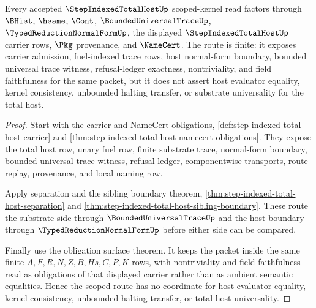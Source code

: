 \begin{theorem}
\label{thm:step-indexed-total-host-scoped-kernel-route}
Every accepted $\StepIndexedTotalHostUp$ scoped-kernel read factors through $\BHist$, $\hsame$, $\Cont$, $\BoundedUniversalTraceUp$, $\TypedReductionNormalFormUp$, the displayed $\StepIndexedTotalHostUp$ carrier rows, $\Pkg$ provenance, and $\NameCert$. The route is finite: it exposes carrier admission, fuel-indexed trace rows, host normal-form boundary, bounded universal trace witness, refusal-ledger exactness, nontriviality, and field faithfulness for the same packet, but it does not assert host evaluator equality, kernel consistency, unbounded halting transfer, or substrate universality for the total host.
\end{theorem}
\begin{proof}
Start with the carrier and NameCert obligations, \autoref{def:step-indexed-total-host-carrier} and \autoref{thm:step-indexed-total-host-namecert-obligations}. They expose the total host row, unary fuel row, finite substrate trace, normal-form boundary, bounded universal trace witness, refusal ledger, componentwise transports, route replay, provenance, and local naming row.

Apply separation and the sibling boundary theorem, \autoref{thm:step-indexed-total-host-separation} and \autoref{thm:step-indexed-total-host-sibling-boundary}. These route the substrate side through $\BoundedUniversalTraceUp$ and the host boundary through $\TypedReductionNormalFormUp$ before either side can be compared.

Finally use the obligation surface theorem. It keeps the packet inside the same finite $A,F,R,N,Z,B,Hs,C,P,K$ rows, with nontriviality and field faithfulness read as obligations of that displayed carrier rather than as ambient semantic equalities. Hence the scoped route has no coordinate for host evaluator equality, kernel consistency, unbounded halting transfer, or total-host universality.
\end{proof}

